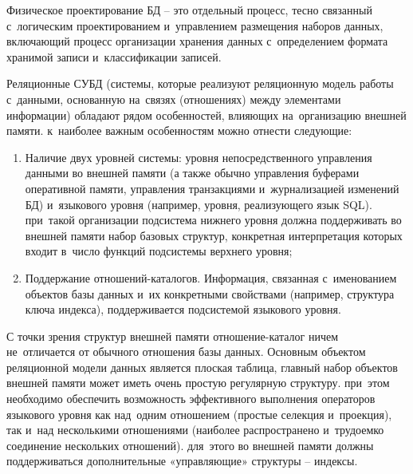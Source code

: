 \documentclass{ou}
\begin{document}
Физическое проектирование БД -- это отдельный процесс, тесно связанный с~логическим проектированием и~управлением размещения наборов данных, включающий процесс организации хранения данных с~определением формата хранимой записи и~классификации записей.

Реляционные СУБД (системы, которые реализуют реляционную модель работы с~данными, основанную на~связях (отношениях) между элементами информации) обладают рядом особенностей, влияющих на~организацию внешней памяти. к~наиболее важным особенностям можно отнести следующие:
\begin{enumerate}[itemindent=4em, nosep, label=\arabic*)]
\item Наличие двух уровней системы: уровня непосредственного управления данными во внешней памяти (а также обычно управления буферами оперативной памяти, управления транзакциями и~журнализацией изменений БД) и~языкового уровня (например, уровня, реализующего язык SQL). при~такой организации подсистема нижнего уровня должна поддерживать во внешней памяти набор базовых структур, конкретная интерпретация которых входит в~число функций подсистемы верхнего уровня;
\item Поддержание отношений-каталогов. Информация, связанная с~именованием объектов базы данных и~их конкретными свойствами (например, структура ключа индекса), поддерживается подсистемой языкового уровня.
\end{enumerate}

С точки зрения структур внешней памяти отношение-каталог ничем не~отличается от обычного отношения базы данных. Основным объектом реляционной модели данных является плоская таблица, главный набор объектов внешней памяти может иметь очень простую регулярную структуру. при~этом необходимо обеспечить возможность эффективного выполнения операторов языкового уровня как над~одним отношением (простые селекция и~проекция), так и~над несколькими отношениями (наиболее распространено и~трудоемко соединение нескольких отношений). для~этого во внешней памяти должны поддерживаться дополнительные «управляющие» структуры -- индексы.
\end{document}

